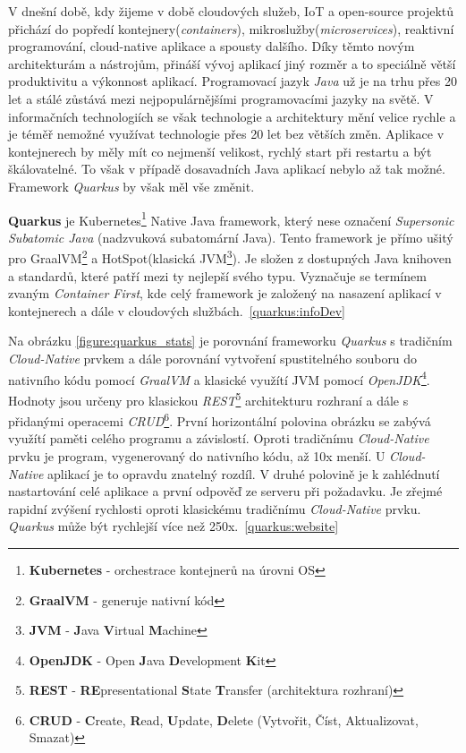 V dnešní době, kdy žijeme v době cloudových služeb, IoT a open-source projektů přichází do popředí kontejnery(\emph{containers}), mikroslužby(\emph{microservices}), reaktivní programování, cloud-native aplikace a spousty dalšího.
Díky těmto novým architekturám a nástrojům, přináší vývoj aplikací jiný rozměr a to speciálně větší produktivitu a výkonnost aplikací.
Programovací jazyk \emph{Java} už je na trhu přes 20 let a stálé zůstává mezi nejpopulárnějšími programovacími jazyky na světě.
V informačních technologiích se však technologie a architektury mění velice rychle a je téměř nemožné využívat technologie přes 20 let bez větších změn. Aplikace v kontejnerech by měly mít co nejmenší velikost, rychlý start při restartu a být škálovatelné.
To však v případě dosavadních Java aplikací nebylo až tak možné. Framework \emph{Quarkus} by však měl vše změnit.

\textbf{Quarkus} je Kubernetes\footnote{\textbf{Kubernetes} - orchestrace kontejnerů na úrovni OS} Native Java framework, který nese označení \emph{Supersonic Subatomic Java} (nadzvuková subatomární Java).
Tento framework je přímo ušitý pro GraalVM\footnote{\textbf{GraalVM} - generuje nativní kód} a HotSpot(klasická JVM\footnote{\textbf{JVM} - \textbf{J}ava \textbf{V}irtual \textbf{M}achine}).
Je složen z dostupných Java knihoven a standardů, které patří mezi ty nejlepší svého typu.
Vyznačuje se termínem zvaným \emph{Container First}, kde celý framework je založený na nasazení aplikací v kontejnerech a dále v cloudových službách.~\ref{quarkus:infoDev}

Na obrázku \ref{figure:quarkus_stats} je porovnání frameworku \emph{Quarkus} s tradičním \emph{Cloud-Native} prvkem a dále porovnání vytvoření spustitelného souboru do nativního kódu pomocí \emph{GraalVM} a klasické využítí JVM pomocí \emph{OpenJDK}\footnote{\textbf{OpenJDK} - Open \textbf{J}ava \textbf{D}evelopment \textbf{K}it}.
Hodnoty jsou určeny pro klasickou \emph{REST}\footnote{\textbf{REST} - \textbf{RE}presentational \textbf{S}tate \textbf{T}ransfer (architektura rozhraní)} architekturu rozhraní a dále s přidanými operacemi \emph{CRUD}\footnote{\textbf{CRUD} - \textbf{C}reate, \textbf{R}ead, \textbf{U}pdate, \textbf{D}elete (Vytvořit, Číst, Aktualizovat, Smazat)}.
První horizontální polovina obrázku se zabývá využítí paměti celého programu a závislostí.
Oproti tradičnímu \emph{Cloud-Native} prvku je program, vygenerovaný do nativního kódu, až 10x menší.
U \emph{Cloud-Native} aplikací je to opravdu znatelný rozdíl.
V druhé polovině je k zahlédnutí nastartování celé aplikace a první odpověď ze serveru při požadavku.
Je zřejmé rapidní zvýšení rychlosti oproti klasickému tradičnímu \emph{Cloud-Native} prvku.
\emph{Quarkus} může být rychlejší více než 250x.~\ref{quarkus:website}

